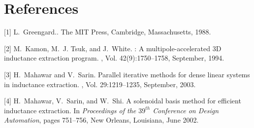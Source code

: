 \documentclass{report}
\begin{document}
\section*{References}
[1] L.~Greengard..
\newblock The MIT Press, Cambridge, Massachusetts, 1988.

\parindent=0pt
[2] M.~Kamon, M.~J. Tsuk, and J.~White.
: A multipole-accelerated 3{D} inductance extraction program.
, Vol.
42(9):1750--1758, September, 1994.

[3] H.~Mahawar and V.~Sarin.
\newblock Parallel iterative methods for dense linear systems in inductance extraction.
, Vol. 29:1219--1235, September, 2003.

[4] H.~Mahawar, V.~Sarin, and W.~Shi.
\newblock A solenoidal basis method for efficient inductance extraction.
\newblock In {\em Proceedings of the $39^{th}$ Conference on Design
Automation}, pages 751--756, New Orleans, Louisiana, June 2002.
\end{document}
